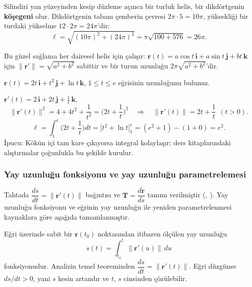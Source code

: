 \begin{tahta}
Silindiri yan yüzeyinden kesip düzleme açınca bir turluk helis, bir dikdörtgenin \textbf{köşegeni} olur. Dikdörtgenin tabanı
çemberin çevresi $2\pi\cdot5=10\pi$, yüksekliği bir turdaki yükselme $12\cdot2\pi=24\pi$'dir:
\[ \ell=\sqrt{(10\pi)^2+(24\pi)^2}=\pi\sqrt{100+576}=26\pi . \]
\end{tahta}

Bu güzel sağlama her dairesel helis için çalışır: $\mathbf r(t)=a\cos t\,\mathbf i+a\sin t\,\mathbf j+bt\,\mathbf k$ için
$\|\mathbf r'\|=\sqrt{a^2+b^2}$ sabittir ve bir turun uzunluğu $2\pi\sqrt{a^2+b^2}$'dir.

\begin{soru}
$\mathbf r(t)=2t\,\mathbf i+t^2\,\mathbf j+\ln t\,\mathbf k$, $1\le t\le e$ eğrisinin uzunluğunu bulunuz.
\end{soru}
\begin{cevap}
$\mathbf r'(t)=2\,\mathbf i+2t\,\mathbf j+\frac1t\,\mathbf k$,
\[ \|\mathbf r'(t)\|^2=4+4t^2+\frac{1}{t^2}=\Big(2t+\frac1t\Big)^2\quad\Rightarrow\quad\|\mathbf r'(t)\|=2t+\frac1t\ \ (t>0). \]
\[ \ell=\int_1^e\Big(2t+\frac1t\Big)dt=\big[t^2+\ln t\big]_1^e=(e^2+1)-(1+0)=e^2 . \]
İpucu: Kökün içi tam kare çıkıyorsa integral kolaylaşır; ders kitaplarındaki alıştırmalar çoğunlukla bu şekilde kurulur.
\end{cevap}

\subsubsection{Yay uzunluğu fonksiyonu ve yay uzunluğu parametrelemesi}

\begin{bilgi}
Tahtada $\dfrac{ds}{dt}=\|\mathbf r'(t)\|$ bağıntısı ve $\mathbf T=\dfrac{d\mathbf r}{ds}$ tanımı verilmiştir
(, ). Yay uzunluğu fonksiyonu ve eğrinin yay uzunluğu ile
yeniden parametrelenmesi kaynaklara göre aşağıda tamamlanmıştır.
\end{bilgi}

\begin{tanim}
Eğri üzerinde sabit bir $\mathbf r(t_0)$ noktasından itibaren ölçülen yay uzunluğu
\[ s(t)=\int_{t_0}^{t}\|\mathbf r'(u)\|\,du \]
fonksiyonudur. Analizin temel teoreminden $\dfrac{ds}{dt}=\|\mathbf r'(t)\|$. Eğri düzgünse $ds/dt>0$, yani $s$ kesin artandır ve
$t$, $s$ cinsinden çözülebilir.
\end{tanim}

